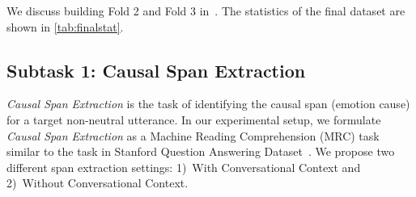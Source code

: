 \documentclass[11pt,a4paper]{article}
\theoremstyle{definition}
\newcommand\RECCONDA{RECCON}
\newcommand\RECCONDADD{RECCON-DD}
\newcommand\RECCONDAIE{RECCON-IE}
\begin{document}
We discuss building Fold 2 and Fold 3 in~. The statistics of the final dataset are shown in \cref{tab:finalstat}. 


\begin{table}[ht!]
\centering
{}
\caption{\footnotesize{The statistics of \RECCONDA{} comprising both positive (valid) and negative (invalid) UCS pairs. DD  \RECCONDADD{}; IEMO  \RECCONDAIE{}. Utterances with only latent emotion causes are ignored in our experiments.}}
\label{tab:finalstat}
\end{table}






\subsection{Subtask 1: Causal Span Extraction}
\label{sec:cse}
\textit{Causal Span Extraction} is the task of identifying the causal span (emotion cause) for a target non-neutral utterance. In our experimental setup, we formulate \textit{Causal Span Extraction} as a Machine Reading Comprehension (MRC) task similar to the task in Stanford Question Answering Dataset~\citep{rajpurkar2016squad}. We propose two different span extraction settings: 1)~With Conversational Context and 2)~Without Conversational Context.
\end{document}
